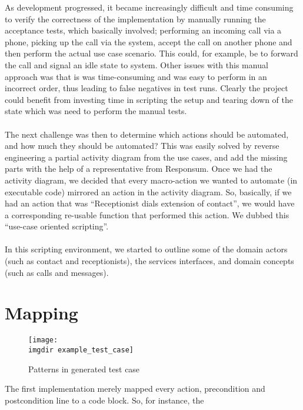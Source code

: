 As development progressed, it became increasingly difficult and time consuming to verify the correctness of the implementation by manually running the acceptance tests, which basically involved; performing an incoming call via a phone, picking up the call via the system, accept the call on another phone and then perform the actual use case scenario. This could, for example, be to forward the call and signal an idle state to system. Other issues with this manual approach was that is was time-consuming and was easy to perform in an incorrect order, thus leading to false negatives in test runs. Clearly the project could benefit from investing time in scripting the setup and tearing down of the state which was need to perform the manual tests.\\\\
The next challenge was then to determine which actions should be automated, and how much they should be automated? This was easily solved by reverse engineering a partial activity diagram from the use cases, and add the missing parts with the help of a representative from Responsum. Once we had the activity diagram, we decided that every macro-action we wanted to automate (in executable code) mirrored an action in the activity diagram. So, basically, if we had an action that was ``Receptionist dials extension of contact'', we would have a corresponding re-usable function that performed this action. We dubbed this ``use-case oriented scripting''.\\\\
In this scripting environment, we started to outline some of the domain actors (such as contact and receptionists), the services interfaces, and domain concepts (such as calls and messages).

\section{Mapping}

\begin{figure}[ht]
\centering
\texttt{[image: \\imgdir example\_test\_case]}
\caption{Patterns in generated test case}
\label{fig:domain_model}
\end{figure}
The first implementation merely mapped every action, precondition and postcondition line to a code block. So, for instance, the %

